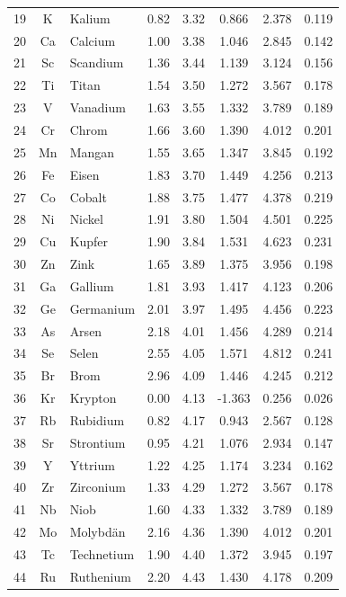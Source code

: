 \documentclass[12pt,a4paper]{article}
\begin{document}
\begin{longtable}{|c|c|p{2.5cm}|c|c|c|c|c|}
		19 & K & Kalium & 0.82 & 3.32 & 0.866 & 2.378 & 0.119 \\
		20 & Ca & Calcium & 1.00 & 3.38 & 1.046 & 2.845 & 0.142 \\
		21 & Sc & Scandium & 1.36 & 3.44 & 1.139 & 3.124 & 0.156 \\
		22 & Ti & Titan & 1.54 & 3.50 & 1.272 & 3.567 & 0.178 \\
		23 & V & Vanadium & 1.63 & 3.55 & 1.332 & 3.789 & 0.189 \\
		24 & Cr & Chrom & 1.66 & 3.60 & 1.390 & 4.012 & 0.201 \\
		25 & Mn & Mangan & 1.55 & 3.65 & 1.347 & 3.845 & 0.192 \\
		26 & Fe & Eisen & 1.83 & 3.70 & 1.449 & 4.256 & 0.213 \\
		27 & Co & Cobalt & 1.88 & 3.75 & 1.477 & 4.378 & 0.219 \\
		28 & Ni & Nickel & 1.91 & 3.80 & 1.504 & 4.501 & 0.225 \\
		29 & Cu & Kupfer & 1.90 & 3.84 & 1.531 & 4.623 & 0.231 \\
		30 & Zn & Zink & 1.65 & 3.89 & 1.375 & 3.956 & 0.198 \\
		31 & Ga & Gallium & 1.81 & 3.93 & 1.417 & 4.123 & 0.206 \\
		32 & Ge & Germanium & 2.01 & 3.97 & 1.495 & 4.456 & 0.223 \\
		33 & As & Arsen & 2.18 & 4.01 & 1.456 & 4.289 & 0.214 \\
		34 & Se & Selen & 2.55 & 4.05 & 1.571 & 4.812 & 0.241 \\
		35 & Br & Brom & 2.96 & 4.09 & 1.446 & 4.245 & 0.212 \\
		36 & Kr & Krypton & 0.00 & 4.13 & -1.363 & 0.256 & 0.026 \\
		37 & Rb & Rubidium & 0.82 & 4.17 & 0.943 & 2.567 & 0.128 \\
		38 & Sr & Strontium & 0.95 & 4.21 & 1.076 & 2.934 & 0.147 \\
		39 & Y & Yttrium & 1.22 & 4.25 & 1.174 & 3.234 & 0.162 \\
		40 & Zr & Zirconium & 1.33 & 4.29 & 1.272 & 3.567 & 0.178 \\
		41 & Nb & Niob & 1.60 & 4.33 & 1.332 & 3.789 & 0.189 \\
		42 & Mo & Molybdän & 2.16 & 4.36 & 1.390 & 4.012 & 0.201 \\
		43 & Tc & Technetium & 1.90 & 4.40 & 1.372 & 3.945 & 0.197 \\
		44 & Ru & Ruthenium & 2.20 & 4.43 & 1.430 & 4.178 & 0.209 \\

\end{longtable}
\end{document}

